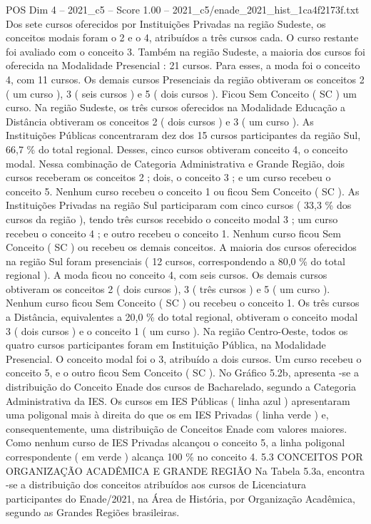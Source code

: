 \begin{textsample}{POS Dim 4 – 2021\_c5 – Score 1.00 – 2021\_c5/enade\_2021\_hist\_1ca4f2173f.txt}
Dos sete cursos oferecidos por Instituições Privadas na região Sudeste, os conceitos modais foram o 2 e o 4, atribuídos a três cursos cada.
O curso restante foi avaliado com o conceito 3.
Também na região Sudeste, a maioria dos cursos foi oferecida na Modalidade Presencial : 21 cursos.
Para esses, a moda foi o conceito 4, com 11 cursos.
Os demais cursos Presenciais da região obtiveram os conceitos 2 ( um curso ), 3 ( seis cursos ) e 5 ( dois cursos ).
Ficou Sem Conceito ( SC ) um curso.
Na região Sudeste, os três cursos oferecidos na Modalidade Educação a Distância obtiveram os conceitos 2 ( dois cursos ) e 3 ( um curso ).
As Instituições Públicas concentraram dez dos 15 cursos participantes da região Sul, 66,7 \% do total regional.
Desses, cinco cursos obtiveram conceito 4, o conceito modal.
Nessa combinação de Categoria Administrativa e Grande Região, dois cursos receberam os conceitos 2 ; dois, o conceito 3 ; e um curso recebeu o conceito 5.
Nenhum curso recebeu o conceito 1 ou ficou Sem Conceito ( SC ).
As Instituições Privadas na região Sul participaram com cinco cursos ( 33,3 \% dos cursos da região ), tendo três cursos recebido o conceito modal 3 ; um curso recebeu o conceito 4 ; e outro recebeu o conceito 1.
Nenhum curso ficou Sem Conceito ( SC ) ou recebeu os demais conceitos.
A maioria dos cursos oferecidos na região Sul foram presenciais ( 12 cursos, correspondendo a 80,0 \% do total regional ).
A moda ficou no conceito 4, com seis cursos.
Os demais cursos obtiveram os conceitos 2 ( dois cursos ), 3 ( três cursos ) e 5 ( um curso ).
Nenhum curso ficou Sem Conceito ( SC ) ou recebeu o conceito 1.
Os três cursos a Distância, equivalentes a 20,0 \% do total regional, obtiveram o conceito modal 3 ( dois cursos ) e o conceito 1 ( um curso ).
Na região Centro-Oeste, todos os quatro cursos participantes foram em Instituição Pública, na Modalidade Presencial.
O conceito modal foi o 3, atribuído a dois cursos.
Um curso recebeu o conceito 5, e o outro ficou Sem Conceito ( SC ).
No Gráfico 5.2b, apresenta -se a distribuição do Conceito Enade dos cursos de Bacharelado, segundo a Categoria Administrativa da IES.
Os cursos em IES Públicas ( linha azul ) apresentaram uma poligonal mais à direita do que os em IES Privadas ( linha verde ) e, consequentemente, uma distribuição de Conceitos Enade com valores maiores.
Como nenhum curso de IES Privadas alcançou o conceito 5, a linha poligonal correspondente ( em verde ) alcança 100 \% no conceito 4. 5.3 CONCEITOS POR ORGANIZAÇÃO ACADÊMICA E GRANDE REGIÃO Na Tabela 5.3a, encontra -se a distribuição dos conceitos atribuídos aos cursos de Licenciatura participantes do Enade/2021, na Área de História, por Organização Acadêmica, segundo as Grandes Regiões brasileiras.

\end{textsample}
